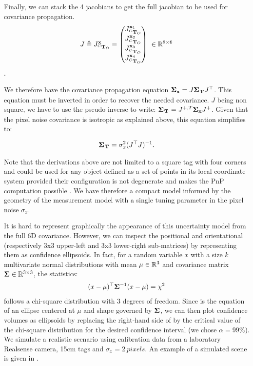 Finally, we can stack the 4 jacobians to get the full jacobian to be used for covariance propagation.
\begin{equation}
    J \triangleq J^{{\bf x}}_{\prescript{C}{}{{\bf T}}_{O}}=
    \begin{pmatrix}
    J^{{\bf x}_1}_{\prescript{C}{}{{\bf T}}_{O}} \\ J^{{\bf x}_2}_{\prescript{C}{}{{\bf T}}_{O}} \\ J^{{\bf x}_3}_{\prescript{C}{}{{\bf T}}_{O}} \\ J^{{\bf x}_4}_{\prescript{C}{}{{\bf T}}_{O}}
    \end{pmatrix}
    ~ \in \mathbb{R}^{8 \times 6}
\end{equation}.

We therefore have the covariance propagation equation ${\bm \Sigma}_{{\bf x}} = J {\bm \Sigma}_{\prescript{}{}{{\bf T}}_{}} J^{\top}$. 
This equation must be inverted in order to recover the needed covariance. $J$ being non square, 
we have to use the pseudo inverse to write: ${\bm \Sigma}_{\prescript{}{}{{\bf T}}_{}} = J^{+,T} {\bm \Sigma}_{{\bf x}} J^{+}$. 
Given that the pixel noise covariance is isotropic as explained above, this equation simplifies to:

\begin{equation}
    {\bm \Sigma}_{\prescript{}{}{{\bf T}}_{}} = \sigma_{x}^2(J^{\top} J)^{-1}.
\end{equation}

Note that the derivations above are not limited to a square tag with four corners and could be used for any object defined as
a set of points in its local coordinate system provided their configuration is not degenerate and makes the PnP computation possible \cite{gao2003complete}.  
We have therefore a compact model informed by the geometry of the measurement model with a single tuning parameter in the pixel noise $\sigma_x$.

It is hard to represent graphically the appearance of this uncertainty model from the full 6D covariance. However, we can inspect the positional and orientational
(respectively 3x3 upper-left and 3x3 lower-right sub-matrices) by representing them as confidence ellipsoids.
In fact, for a random variable $x$ with a size $k$ multivariate normal distributions with mean $\mu \in \mathbb{R}^3$ and 
covariance matrix ${\bm \Sigma} \in \mathbb{R}^{3 \times 3}$, the statistics:
%
\begin{equation}
    (x - \mu)^{\top} {\bm \Sigma}^{-1}(x - \mu) = \chi^2
    \label{eq:chi2}
\end{equation}
%
follows a chi-square distribution with 3 degrees of freedom. Since  is the equation of an ellipse centered at $\mu$ and shape governed by ${\bm \Sigma}$, we can then plot confidence volumes as ellipsoids by replacing the right-hand side of  
 by the critical value of the chi-square distribution for the desired confidence interval (we chose $\alpha=99\%$). We simulate a 
realistic scenario using calibration data from a laboratory Realsense camera, 15cm tags and $\sigma_x = 2~pixels$. An example of a simulated scene is given
in . 

